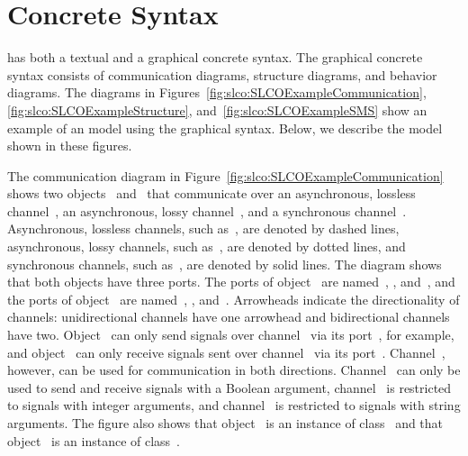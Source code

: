 \section{Concrete Syntax}
\label{sec:slco:syntax}

\SLCO has both a textual and a graphical concrete syntax.
The graphical concrete syntax consists of communication diagrams, structure diagrams, and behavior diagrams.
The diagrams in Figures~\ref{fig:slco:SLCOExampleCommunication}, \ref{fig:slco:SLCOExampleStructure}, and~\ref{fig:slco:SLCOExampleSMS} show an example of an \SLCO model using the graphical syntax.
Below, we describe the model shown in these figures.

The communication diagram in Figure~\ref{fig:slco:SLCOExampleCommunication} shows two objects~ and~ that communicate over an asynchronous, lossless channel~, an asynchronous, lossy channel~, and a synchronous channel~.
Asynchronous, lossless channels, such as~, are denoted by dashed lines, asynchronous, lossy channels, such as~, are denoted by dotted lines, and synchronous channels, such as~, are denoted by solid lines.
The diagram shows that both objects have three ports.
The ports of object~ are named~, , and~, and the ports of object~ are named~, , and~.
Arrowheads indicate the directionality of channels: unidirectional channels have one arrowhead and bidirectional channels have two.
Object~ can only send signals over channel~ via its port~, for example, and object~ can only receive signals sent over channel~ via its port~.
Channel~, however, can be used for communication in both directions.
Channel~ can only be used to send and receive signals with a Boolean argument, channel~ is restricted to signals with integer arguments, and channel~ is restricted to signals with string arguments.
The figure also shows that object~ is an instance of class~ and that object~ is an instance of class~.

